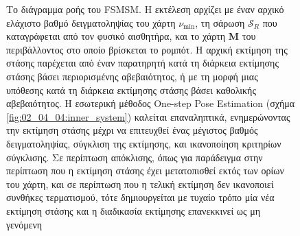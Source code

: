 \begin{figure}\centering
  
  \caption{\small Το διάγραμμα ροής του FSMSM. Η εκτέλεση αρχίζει με έναν αρχικό
           ελάχιστο βαθμό δειγματοληψίας του χάρτη $\nu_{\min}$, τη σάρωση
           $\mathcal{S}_R$ που καταγράφεται από τον φυσικό αισθητήρα, και το
           χάρτη $\bm{M}$ του περιβάλλοντος στο οποίο βρίσκεται το ρομπότ. Η
           αρχική εκτίμηση της στάσης παρέχεται από έναν παρατηρητή κατά τη
           διάρκεια εκτίμησης στάσης βάσει περιορισμένης αβεβαιότητος, ή με τη
           μορφή μιας υπόθεσης κατά τη διάρκεια εκτίμησης στάσης βάσει
           καθολικής αβεβαιότητος. Η εσωτερική μέθοδος One-step Pose Estimation
           (σχήμα \ref{fig:02_04_04:inner_system}) καλείται επαναληπτικά,
           ενημερώνοντας την εκτίμηση στάσης μέχρι να επιτευχθεί ένας μέγιστος
           βαθμός δειγματοληψίας, σύγκλιση της εκτίμησης, και ικανοποίηση
           κριτηρίων σύγκλισης. Σε περίπτωση απόκλισης, όπως για παράδειγμα
           στην περίπτωση που η εκτίμηση στάσης έχει μετατοπισθεί εκτός των
           ορίων του χάρτη, και σε περίπτωση που η τελική εκτίμηση δεν
           ικανοποιεί συνθήκες τερματισμού, τότε δημιουργείται με τυχαίο τρόπο
           μία νέα εκτίμηση στάσης και η διαδικασία εκτίμησης επανεκκινεί ως μη
           γενόμενη} \label{fig:02_04_04:outer_system}
\end{figure}

